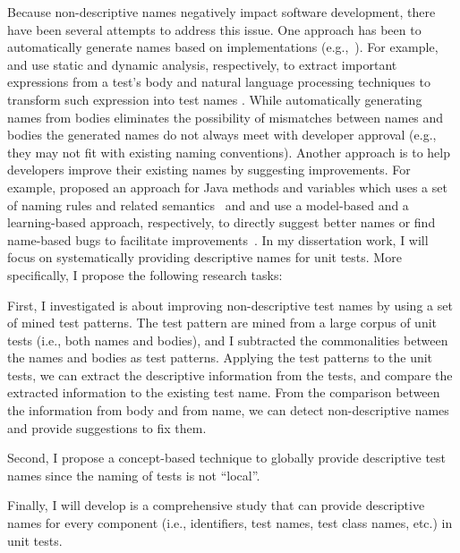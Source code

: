 \documentclass[proposal.tex]{subfiles}
\begin{document}
Because non-descriptive names negatively impact software development, there have been several attempts to address this issue.
%
One approach has been to automatically generate names based on implementations (e.g.,~\cite{arcuri2014automated, zhang2015automatically, daka2017generating}).
%
For example, \citeauthor{zhang2015automatically} and \citeauthor{daka2017generating} use static and dynamic analysis, respectively, to extract important expressions from a test's body and natural language processing techniques to transform such expression into test names \cite{zhang2015automatically, daka2017generating}. 
%
While automatically generating names from bodies eliminates the possibility of mismatches between names and bodies the generated names do not always meet with developer approval (e.g., they may not fit with existing naming conventions).
%
Another approach is to help developers improve their existing names by suggesting improvements.
%
For example, \citeauthor{host2009debugging} proposed an approach for Java methods and variables which uses a set of naming rules and related semantics~\cite{host2009debugging} and \citeauthor{allamanis2015suggesting} and \citeauthor{pradel2018deepbugs} use a model-based and a learning-based approach, respectively, to directly suggest better names or find name-based bugs to facilitate improvements~\cite{allamanis2015suggesting, pradel2018deepbugs}.
%
In my dissertation work, I will focus on systematically providing descriptive names for unit tests.
%
More specifically, I propose the following research tasks:


First, I investigated is about improving non-descriptive test names by using a set of mined test patterns.
%
The test pattern are mined from a large corpus of unit tests (i.e., both names and bodies), and I subtracted the commonalities between the names and bodies as test patterns.
%
Applying the test patterns to the unit tests, we can extract the descriptive information from the tests, and compare the extracted information to the existing test name.
%
From the comparison between the information from body and from name, we can detect non-descriptive names and provide suggestions to fix them.


Second, I propose a concept-based technique to globally provide descriptive test names since the naming of tests is not \enquote{local}.


Finally, I will develop is a comprehensive study that can provide descriptive names for every component (i.e., identifiers, test names, test class names, etc.) in unit tests.
\end{document}
